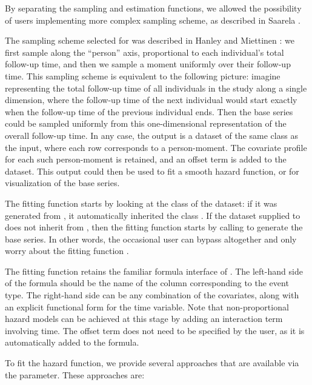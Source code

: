 \documentclass[
]{jss}
\begin{document}
By separating the sampling and estimation functions, we allowed the
possibility of users implementing more complex sampling scheme, as
described in Saarela \citeyearpar{saarela2016case}.

The sampling scheme selected for  was described in
Hanley and Miettinen \citeyearpar{hanley2009fitting}: we first sample
along the ``person'' axis, proportional to each individual's total
follow-up time, and then we sample a moment uniformly over their
follow-up time. This sampling scheme is equivalent to the following
picture: imagine representing the total follow-up time of all
individuals in the study along a single dimension, where the follow-up
time of the next individual would start exactly when the follow-up time
of the previous individual ends. Then the base series could be sampled
uniformly from this one-dimensional representation of the overall
follow-up time. In any case, the output is a dataset of the same class
as the input, where each row corresponds to a person-moment. The
covariate profile for each such person-moment is retained, and an offset
term is added to the dataset. This output could then be used to fit a
smooth hazard function, or for visualization of the base series.

The fitting function  starts by looking at the
class of the dataset: if it was generated from , it
automatically inherited the class . If the dataset supplied
to  does not inherit from , then the
fitting function starts by calling  to generate the
base series. In other words, the occasional user can bypass
 altogether and only worry about the fitting
function .

The fitting function retains the familiar formula interface of
. The left-hand side of the formula should be the name of the
column corresponding to the event type. The right-hand side can be any
combination of the covariates, along with an explicit functional form
for the time variable. Note that non-proportional hazard models can be
achieved at this stage by adding an interaction term involving time. The
offset term does not need to be specified by the user, as it is
automatically added to the formula.

To fit the hazard function, we provide several approaches that are
available via the  parameter. These approaches are:
\end{document}
